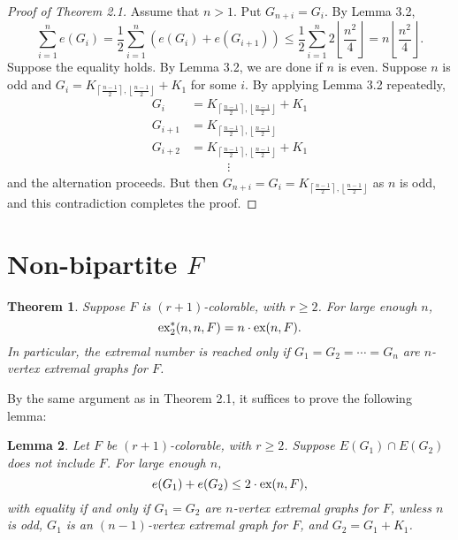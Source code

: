\documentclass[12pt]{report}
\newtheorem{theorem}{Theorem}[chapter]
\newtheorem{lemma}[theorem]{Lemma}
\newcommand*{\ex}{\textnormal{ex}}
\newcommand*{\dexind}{\textnormal{ex}_2^*}
\begin{document}
\begin{proof}[Proof of Theorem 2.1]
  Assume that $n > 1$. Put $G_{n + i} = G_i$. By Lemma 3.2,
  \[
    \sum_{i = 1}^n e(G_i) = \frac{1}{2}\sum_{i = 1}^n (e(G_i) + e(G_{i + 1})) \leq \frac{1}{2}\sum_{i = 1}^n 2\left\lfloor\frac{n^2}{4}\right\rfloor = n\left\lfloor\frac{n^2}{4}\right\rfloor.
  \]
  Suppose the equality holds. By Lemma 3.2, we are done if $n$ is even. Suppose $n$ is odd and $G_i = K_{\left\lceil\frac{n - 1}{2}\right\rceil, \left\lfloor\frac{n - 1}{2}\right\rfloor} + K_1$ for some $i$. By applying Lemma 3.2 repeatedly, 
   \begin{align*}
    G_i &= K_{\left\lceil\frac{n - 1}{2}\right\rceil, \left\lfloor\frac{n - 1}{2}\right\rfloor} + K_1 \\
    G_{i + 1} &= K_{\left\lceil\frac{n - 1}{2}\right\rceil, \left\lfloor\frac{n - 1}{2}\right\rfloor} \\
    G_{i + 2} &= K_{\left\lceil\frac{n - 1}{2}\right\rceil, \left\lfloor\frac{n - 1}{2}\right\rfloor} + K_1 \\
    &\qquad\quad \vdots
   \end{align*}
   and the alternation proceeds. But then $G_{n + i} = G_i = K_{\left\lceil\frac{n - 1}{2}\right\rceil, \left\lfloor\frac{n - 1}{2}\right\rfloor}$ as $n$ is odd, and this contradiction completes the proof.
\end{proof}

\section{Non-bipartite $F$}

\begin{theorem}
  Suppose $F$ is $(r + 1)$-colorable, with $r \geq 2$. For large enough $n$,
  \[
    \dexind(n, n, F) = n \cdot \ex(n, F).
  \]
  In particular, the extremal number is reached only if $G_1 = G_2 = \cdots = G_n$ are $n$-vertex extremal graphs for $F$.
\end{theorem}

By the same argument as in Theorem 2.1, it suffices to prove the following lemma:

\begin{lemma}
  Let $F$ be $(r + 1)$-colorable, with $r \geq 2$. Suppose $E(G_1) \cap E(G_2)$ does not include $F$. For large enough $n$,
  \[
    e(G_1) + e(G_2) \leq 2 \cdot \ex(n, F),
  \]
  with equality if and only if $G_1 = G_2$ are $n$-vertex extremal graphs for $F$, unless $n$ is odd, $G_1$ is an $(n - 1)$-vertex extremal graph for $F$, and $G_2 = G_1 + K_1$. 
\end{lemma}
\end{document}
